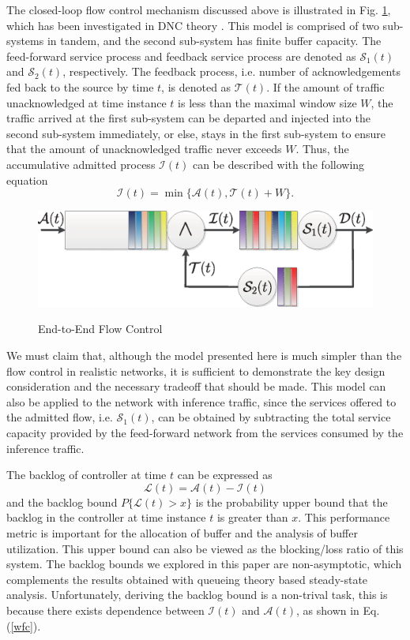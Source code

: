 \documentclass[12pt]{article}
\begin{document}
The closed-loop flow control mechanism discussed above is illustrated in Fig. \ref{control1}, which has been investigated in DNC theory \cite{CrOk96,AgRa96,Chan98,ACOR99,QLDD09FC,bose2006analysis,Qian2010Analysis}. This model is comprised of two sub-systems in tandem, and the second sub-system has finite buffer capacity. The feed-forward service process and feedback service process are denoted as $\mathcal{S}_1(t)$ and $\mathcal{S}_2(t)$, respectively. The feedback process, i.e. number of acknowledgements fed back to the source by time $t$, is denoted as $\mathcal{T}(t)$. If the amount of traffic unacknowledged at time instance $t$ is less than the maximal window size $W$, the traffic arrived at the first sub-system can be departed and injected into the second sub-system immediately, or else, stays in the first sub-system to ensure that the amount of unacknowledged traffic never exceeds $W$. Thus, the accumulative admitted process $\mathcal{I}(t)$ can be described with the following equation
\begin{equation}\label{wfc}
\mathcal{I}(t)=\min\{\mathcal{A}(t),\mathcal{T}(t)+W\}.
\end{equation}
\begin{figure}[ht]
  \centering\includegraphics[scale=0.45]{figures/QueueModel1.eps}\\
  \caption{End-to-End Flow Control}\label{control1}
\end{figure}

We must claim that, although the model presented here is much simpler than the flow control in realistic networks, it is sufficient to demonstrate the key design consideration and the necessary tradeoff that should be made. This model can also be applied to the network with inference traffic, since the services offered to the admitted flow, i.e. $\mathcal{S}_1(t)$, can be obtained by subtracting the total service capacity provided by the feed-forward network from the services consumed by the inference traffic.

The backlog of controller at time $t$ can be expressed as $$\mathcal{L}(t)=\mathcal{A}(t)-\mathcal{I}(t)$$ and the backlog bound $P\{\mathcal{L}(t)>x\}$ is the probability upper bound that the backlog in the controller at time instance $t$ is greater than $x$. This performance metric is important for the allocation of buffer and the analysis of buffer utilization. This upper bound can also be viewed as the blocking/loss ratio of this system. The backlog bounds we explored in this paper are non-asymptotic, which complements the results obtained with queueing theory based steady-state analysis. Unfortunately, deriving the backlog bound is a non-trival task, this is because there exists dependence between $\mathcal{I}(t)$ and $\mathcal{A}(t)$, as shown in Eq.(\ref{wfc}).
\end{document}
